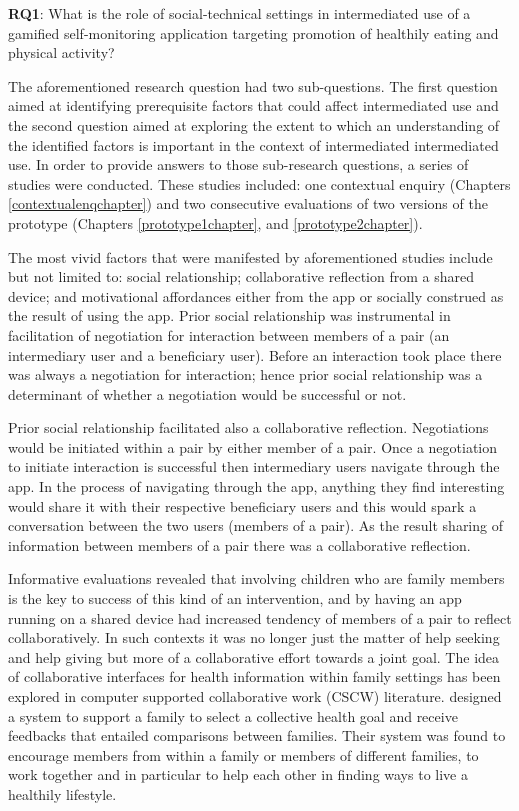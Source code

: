 \textbf{RQ1}: What is the role of social-technical settings in intermediated use of a gamified self-monitoring application targeting promotion of healthily eating and physical activity? 

The aforementioned research question had two sub-questions. The first question aimed at identifying prerequisite factors that could affect intermediated use and the second question aimed at exploring the extent to which an understanding of the identified factors is important in the context of intermediated intermediated use. In order to provide answers to those sub-research questions, a series of studies were conducted. These studies included: one contextual enquiry (Chapters \ref{contextualenqchapter}) and two consecutive evaluations of two versions of the prototype (Chapters \ref{prototype1chapter}, and \ref{prototype2chapter}). 

The most vivid factors that were manifested by aforementioned studies include but not limited to: social relationship; collaborative reflection from a shared device; and motivational affordances  either from the app or socially construed as the result of using the app. Prior social relationship was instrumental in facilitation of negotiation for interaction between members of a pair (an intermediary user and a beneficiary user). Before an interaction took place there was always a negotiation for interaction; hence prior social relationship was a determinant of whether a negotiation would be successful or not.

Prior social relationship facilitated also a collaborative reflection. Negotiations would be initiated within a pair by either member of a pair. Once a negotiation to initiate interaction is successful then intermediary users navigate through the app. In the process of navigating through the app, anything they find interesting would share it with their respective beneficiary users and this would spark a conversation between the two users (members of a pair). As the result sharing of information between members of a pair there was a collaborative reflection. 

Informative evaluations revealed that involving children who are family members is the key to success of this kind of an intervention, and by having an app running on a shared device had increased tendency of members of a pair to reflect collaboratively. In such contexts it was no longer just the matter of help seeking and help giving but more of a collaborative effort towards a joint goal. The idea of collaborative interfaces for health information within family settings has been explored in computer supported collaborative work (CSCW) literature. \cite{colineau2011motivating} designed a system to support a family to select a collective health goal and receive feedbacks that entailed comparisons between families. Their system was found to encourage members from within a family or members of different families, to work together and in particular to help each other in finding ways to live a healthily lifestyle. 

